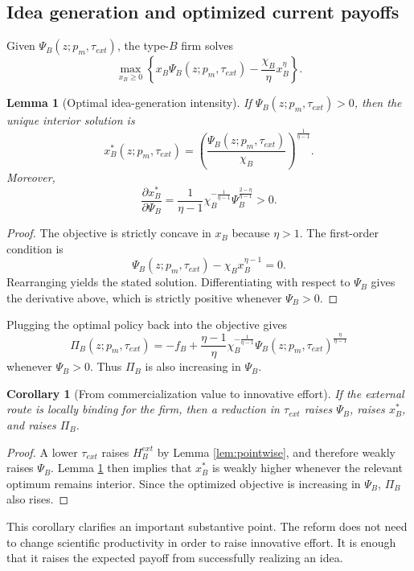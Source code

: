 \documentclass[12pt]{article}
\newtheorem{lemma}{Lemma}
\newtheorem{corollary}{Corollary}
\begin{document}
\subsection{Idea generation and optimized current payoffs}

Given \(\Psi_B(z;p_m,\tau_{ext})\), the type-\(B\) firm solves
\[
\max_{x_B\ge 0}
\left\{
x_B\Psi_B(z;p_m,\tau_{ext})
-\frac{\chi_B}{\eta}x_B^\eta
\right\}.
\]

\begin{lemma}[Optimal idea-generation intensity]
\label{lem:xb}
If \(\Psi_B(z;p_m,\tau_{ext})>0\), then the unique interior solution is
\[
x_B^*(z;p_m,\tau_{ext})
=
\left(
\frac{\Psi_B(z;p_m,\tau_{ext})}{\chi_B}
\right)^{\frac{1}{\eta-1}}.
\]
Moreover,
\[
\frac{\partial x_B^*}{\partial \Psi_B}
=
\frac{1}{\eta-1}
\chi_B^{-\frac{1}{\eta-1}}
\Psi_B^{\frac{2-\eta}{\eta-1}}
>0.
\]
\end{lemma}

\begin{proof}
The objective is strictly concave in \(x_B\) because \(\eta>1\). The first-order condition is
\[
\Psi_B(z;p_m,\tau_{ext})-\chi_B x_B^{\eta-1}=0.
\]
Rearranging yields the stated solution. Differentiating with respect to \(\Psi_B\) gives the derivative above, which is strictly positive whenever \(\Psi_B>0\).
\end{proof}

Plugging the optimal policy back into the objective gives
\[
\Pi_B(z;p_m,\tau_{ext})
=
-f_B
+
\frac{\eta-1}{\eta}
\chi_B^{-\frac{1}{\eta-1}}
\Psi_B(z;p_m,\tau_{ext})^{\frac{\eta}{\eta-1}}
\]
whenever \(\Psi_B>0\). Thus \(\Pi_B\) is also increasing in \(\Psi_B\).

\begin{corollary}[From commercialization value to innovative effort]
\label{cor:tau_to_x}
If the external route is locally binding for the firm, then a reduction in \(\tau_{ext}\) raises \(\Psi_B\), raises \(x_B^*\), and raises \(\Pi_B\).
\end{corollary}

\begin{proof}
A lower \(\tau_{ext}\) raises \(H_B^{ext}\) by Lemma \ref{lem:pointwise}, and therefore weakly raises \(\Psi_B\). Lemma \ref{lem:xb} then implies that \(x_B^*\) is weakly higher whenever the relevant optimum remains interior. Since the optimized objective is increasing in \(\Psi_B\), \(\Pi_B\) also rises.
\end{proof}

This corollary clarifies an important substantive point. The reform does not need to change scientific productivity in order to raise innovative effort. It is enough that it raises the expected payoff from successfully realizing an idea.
\end{document}
